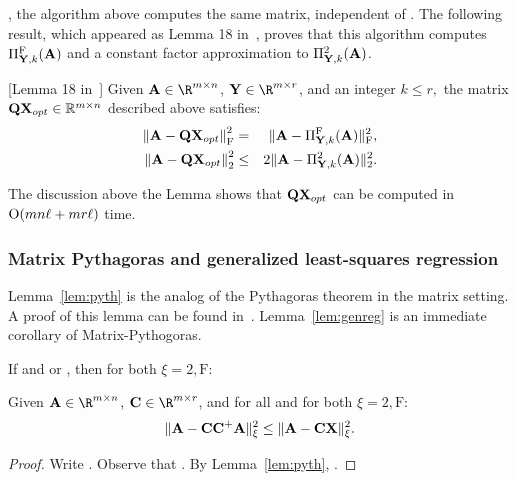 \math{\xi}, the algorithm above computes the same matrix, independent of \math{\xi}.
The following result, which appeared as Lemma 18 in~\cite{BDM11a},
proves that this algorithm computes $\Pi_{{\bm{\mathrm{Y}}},k}^{\mathrm{F}}({\bm{\mathrm{A}}})$ and a constant factor approximation to $\Pi_{{\bm{\mathrm{Y}}},k}^{2}({\bm{\mathrm{A}}})$.
%
\begin{lemma}\label{lem:bestF}[Lemma 18 in~\cite{BDM11a}]
Given $\matA \in {\R}^{m \times n}$, $\matY\in\R^{m\times r}$,
and an integer $k \le r,$ the matrix
${\bm{\mathrm{Q}}}{\bm{\mathrm{X}}}_{opt} \in \mathbb{R}^{m \times n}$ described above satisfies:
%
\begin{eqnarray*}
%
\norm{\matA-\matQ\matX_{opt}}_{\mathrm{F}}^2 &=& \FNormS{\matA-\Pi_{\matY,k}^{\mathrm{F}}(\matA)},\\
%
\norm{\matA-\matQ\matX_{opt}}_2^2 &\leq& 2\TNormS{\matA-\Pi_{\matY,k}^{2}(\matA)}.
%
\end{eqnarray*}
%
\end{lemma}
The discussion above the Lemma shows that ${\bm{\mathrm{Q}}} {\bm{\mathrm{X}}}_{opt}$ can be computed in $\mathrm{O}(m n \ell + m r \ell)$ time.

\subsubsection{Matrix Pythagoras and generalized least-squares regression}
Lemma~\ref{lem:pyth} is the analog of the Pythagoras theorem in the matrix setting. A proof of this lemma can be found in~\cite{BDM11a}.
Lemma~\ref{lem:genreg} is an immediate corollary of Matrix-Pythogoras.
\begin{lemma}\label{lem:pyth}
If  and
 or , then for both $\xi = 2, \mathrm{F}:$
%
\end{lemma}

\begin{lemma}\label{lem:genreg}
Given $\matA \in \R^{m \times n}$, $\matC \in \R^{m \times r}$, and for all   and  for both $\xi = 2, \mathrm{F}:$
$$\mbox{}\| {\bm{\mathrm{A}}}- {\bm{\mathrm{C}}}{\bm{\mathrm{C}}}^+ {\bm{\mathrm{A}}}\|_{\xi}^2 \le \mbox{}\| {\bm{\mathrm{A}}} - {\bm{\mathrm{C}}} {\bm{\mathrm{X}}} \|_{\xi}^2.$$
\end{lemma}
\begin{proof}
Write \math{\matA-\matC\matX=(\matI-\matC\matC^+)\matA+\matC(\matC^+ \matA
-\matX)}. Observe that . By Lemma~\ref{lem:pyth},
.
\end{proof}

